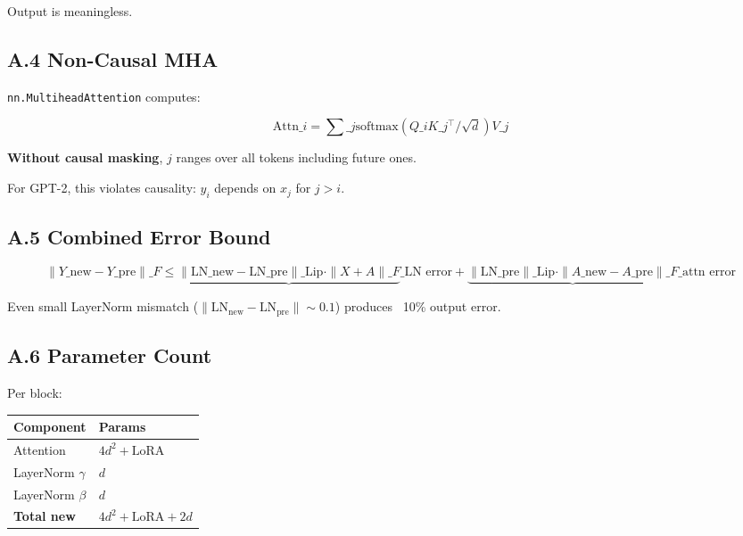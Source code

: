 Output is meaningless.

\subsection{A.4 Non-Causal MHA}

\texttt{nn.MultiheadAttention} computes:

\[
\text{Attn}\_i = \sum\_j \text{softmax}(Q\_i K\_j^\top / \sqrt{d}) V\_j
\tag{A.6}
\]

\textbf{Without causal masking}, $j$ ranges over all tokens including future ones.

For GPT-2, this violates causality: $y_i$ depends on $x_j$ for $j > i$.

\subsection{A.5 Combined Error Bound}

\[
\|Y\_\text{new} - Y\_\text{pre}\|\_F \leq \underbrace{\|\text{LN}\_\text{new} - \text{LN}\_\text{pre}\|\_\text{Lip} \cdot \|X + A\|\_F}\_{\text{LN error}} + \underbrace{\|\text{LN}\_\text{pre}\|\_\text{Lip} \cdot \|A\_\text{new} - A\_\text{pre}\|\_F}\_{\text{attn error}}
\tag{A.7}
\]

Even small LayerNorm mismatch ($\|\text{LN}_\text{new} - \text{LN}_\text{pre}\| \sim 0.1$) 
produces ~10\% output error.

\subsection{A.6 Parameter Count}

Per block:

\begin{table}[H]
\centering
\small
\begin{tabular}{ll}
\toprule
\textbf{Component} & \textbf{Params} \\
\midrule
Attention & $4 d^2 + \text{LoRA}$ \\
LayerNorm $\gamma$ & $d$ \\
LayerNorm $\beta$ & $d$ \\
\textbf{Total new} & $4 d^2 + \text{LoRA} + 2d$ \\
\bottomrule
\end{tabular}
\end{table}

